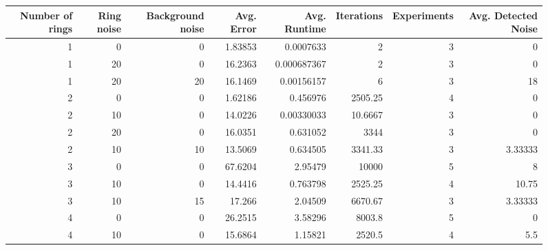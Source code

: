 \documentclass[conference]{IEEEtran}
\begin{document}
\begin{figure*}[!ht]
\centering
\begin{tabular}{rrrrrrrr}
    \hline
       Number of rings &   Ring noise &   Background noise &   Avg. Error &   Avg. Runtime &   Iterations &   Experiments &   Avg. Detected Noise \\
    \hline
                     1 &            0 &                  0 &      1.83853 &    0.0007633   &       2      &             3 &               0       \\
                     1 &           20 &                  0 &     16.2363  &    0.000687367 &       2      &             3 &               0       \\
                     1 &           20 &                 20 &     16.1469  &    0.00156157  &       6      &             3 &              18       \\
                     2 &            0 &                  0 &      1.62186 &    0.456976    &    2505.25   &             4 &               0       \\
                     2 &           10 &                  0 &     14.0226  &    0.00330033  &      10.6667 &             3 &               0       \\
                     2 &           20 &                  0 &     16.0351  &    0.631052    &    3344      &             3 &               0       \\
                     2 &           10 &                 10 &     13.5069  &    0.634505    &    3341.33   &             3 &               3.33333 \\
                     3 &            0 &                  0 &     67.6204  &    2.95479     &   10000      &             5 &               8       \\
                     3 &           10 &                  0 &     14.4416  &    0.763798    &    2525.25   &             4 &              10.75    \\
                     3 &           10 &                 15 &     17.266   &    2.04509     &    6670.67   &             3 &               3.33333 \\
                     4 &            0 &                  0 &     26.2515  &    3.58296     &    8003.8    &             5 &               0       \\
                     4 &           10 &                  0 &     15.6864  &    1.15821     &    2520.5    &             4 &               5.5     \\

\end{tabular}
\end{figure*}
\end{document}
